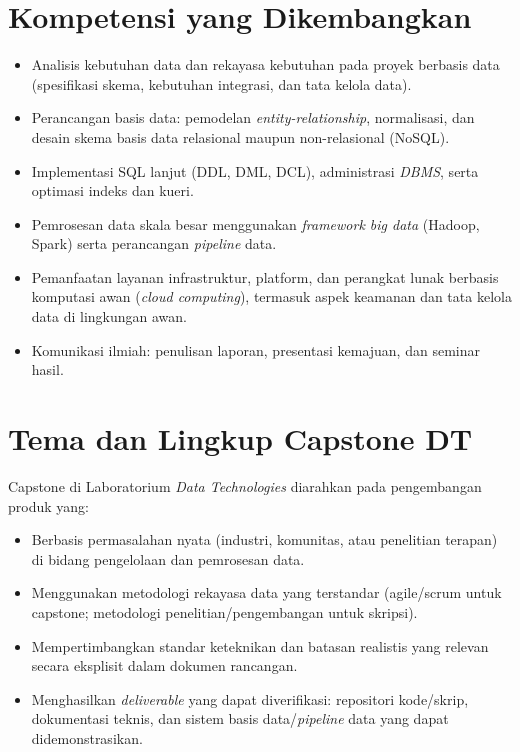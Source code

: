 \documentclass[12pt,a4paper]{report}
\begin{document}
\section{Kompetensi yang Dikembangkan}
\begin{itemize}
\item Analisis kebutuhan data dan rekayasa kebutuhan pada proyek berbasis data (spesifikasi skema, kebutuhan integrasi, dan tata kelola data).
\item Perancangan basis data: pemodelan \emph{entity-relationship}, normalisasi, dan desain skema basis data relasional maupun non-relasional (NoSQL).
\item Implementasi SQL lanjut (DDL, DML, DCL), administrasi \emph{DBMS}, serta optimasi indeks dan kueri.
\item Pemrosesan data skala besar menggunakan \emph{framework big data} (Hadoop, Spark) serta perancangan \emph{pipeline} data.
\item Pemanfaatan layanan infrastruktur, platform, dan perangkat lunak berbasis komputasi awan (\emph{cloud computing}), termasuk aspek keamanan dan tata kelola data di lingkungan awan.
\item Komunikasi ilmiah: penulisan laporan, presentasi kemajuan, dan seminar hasil.
\end{itemize}

\section{Tema dan Lingkup Capstone DT}
Capstone di Laboratorium \emph{Data Technologies} diarahkan pada pengembangan produk yang:
\begin{itemize}
\item Berbasis permasalahan nyata (industri, komunitas, atau penelitian terapan) di bidang pengelolaan dan pemrosesan data.
\item Menggunakan metodologi rekayasa data yang terstandar (agile/scrum untuk capstone; metodologi penelitian/pengembangan untuk skripsi).
\item Mempertimbangkan standar keteknikan dan batasan realistis yang relevan secara eksplisit dalam dokumen rancangan.
\item Menghasilkan \emph{deliverable} yang dapat diverifikasi: repositori kode/skrip, dokumentasi teknis, dan sistem basis data/\emph{pipeline} data yang dapat didemonstrasikan.
\end{itemize}

\end{document}
